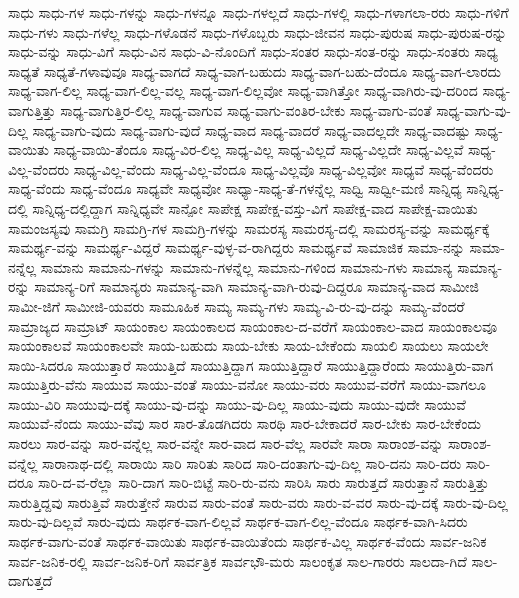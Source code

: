 {ಸಾಧು
ಸಾಧು-ಗಳ
ಸಾಧು-ಗಳನ್ನು
ಸಾಧು-ಗಳನ್ನೂ
ಸಾಧು-ಗಳಲ್ಲದೆ
ಸಾಧು-ಗಳಲ್ಲಿ
ಸಾಧು-ಗಳಾಗಲಾ-ರರು
ಸಾಧು-ಗಳಿಗೆ
ಸಾಧು-ಗಳು
ಸಾಧು-ಗಳೆಲ್ಲ
ಸಾಧು-ಗಳೊಡನೆ
ಸಾಧು-ಗಳೊಬ್ಬರು
ಸಾಧು-ಜೀವನ
ಸಾಧು-ಪುರುಷ
ಸಾಧು-ಪುರುಷ-ರನ್ನು
ಸಾಧು-ವನ್ನು
ಸಾಧು-ವಿಗೆ
ಸಾಧು-ವಿನ
ಸಾಧು-ವಿ-ನೊಂದಿಗೆ
ಸಾಧು-ಸಂತರ
ಸಾಧು-ಸಂತ-ರನ್ನು
ಸಾಧು-ಸಂತರು
ಸಾಧ್ಯ
ಸಾಧ್ಯತೆ
ಸಾಧ್ಯತೆ-ಗಳಾವುವೂ
ಸಾಧ್ಯ-ವಾಗದೆ
ಸಾಧ್ಯ-ವಾಗ-ಬಹುದು
ಸಾಧ್ಯ-ವಾಗ-ಬಹು-ದೆಂದೂ
ಸಾಧ್ಯ-ವಾಗ-ಲಾರದು
ಸಾಧ್ಯ-ವಾಗ-ಲಿಲ್ಲ
ಸಾಧ್ಯ-ವಾಗ-ಲಿಲ್ಲ-ವಲ್ಲ
ಸಾಧ್ಯ-ವಾಗ-ಲಿಲ್ಲವೋ
ಸಾಧ್ಯ-ವಾಗಿತ್ತೋ
ಸಾಧ್ಯ-ವಾಗಿರು-ವು-ದರಿಂದ
ಸಾಧ್ಯ-ವಾಗುತ್ತಿತ್ತು
ಸಾಧ್ಯ-ವಾಗುತ್ತಿರ-ಲಿಲ್ಲ
ಸಾಧ್ಯ-ವಾಗುವ
ಸಾಧ್ಯ-ವಾಗು-ವಂತಿರ-ಬೇಕು
ಸಾಧ್ಯ-ವಾಗು-ವಂತೆ
ಸಾಧ್ಯ-ವಾಗು-ವು-ದಿಲ್ಲ
ಸಾಧ್ಯ-ವಾಗು-ವುದು
ಸಾಧ್ಯ-ವಾಗು-ವುದೆ
ಸಾಧ್ಯ-ವಾದ
ಸಾಧ್ಯ-ವಾದರೆ
ಸಾಧ್ಯ-ವಾದಲ್ಲದೇ
ಸಾಧ್ಯ-ವಾದಷ್ಟು
ಸಾಧ್ಯ-ವಾಯಿತು
ಸಾಧ್ಯ-ವಾಯಿ-ತೆಂದೂ
ಸಾಧ್ಯ-ವಿರ-ಲಿಲ್ಲ
ಸಾಧ್ಯ-ವಿಲ್ಲ
ಸಾಧ್ಯ-ವಿಲ್ಲದೆ
ಸಾಧ್ಯ-ವಿಲ್ಲದೇ
ಸಾಧ್ಯ-ವಿಲ್ಲವೆ
ಸಾಧ್ಯ-ವಿಲ್ಲ-ವೆಂದರು
ಸಾಧ್ಯ-ವಿಲ್ಲ-ವೆಂದು
ಸಾಧ್ಯ-ವಿಲ್ಲ-ವೆಂದೂ
ಸಾಧ್ಯ-ವಿಲ್ಲವೊ
ಸಾಧ್ಯ-ವಿಲ್ಲವೋ
ಸಾಧ್ಯವೆ
ಸಾಧ್ಯ-ವೆಂದರು
ಸಾಧ್ಯ-ವೆಂದು
ಸಾಧ್ಯ-ವೆಂದೂ
ಸಾಧ್ಯವೇ
ಸಾಧ್ಯವೋ
ಸಾಧ್ಯಾ-ಸಾಧ್ಯ-ತೆ-ಗಳನ್ನೆಲ್ಲ
ಸಾಧ್ವಿ
ಸಾಧ್ವೀ-ಮಣಿ
ಸಾನ್ನಿಧ್ಯ
ಸಾನ್ನಿಧ್ಯ-ದಲ್ಲಿ
ಸಾನ್ನಿಧ್ಯ-ದಲ್ಲಿದ್ದಾಗ
ಸಾನ್ನಿಧ್ಯವೇ
ಸಾನ್ಪೋ
ಸಾಪೇಕ್ಷ
ಸಾಪೇಕ್ಷ-ವಸ್ತು-ವಿಗೆ
ಸಾಪೇಕ್ಷ-ವಾದ
ಸಾಪೇಕ್ಷ-ವಾಯಿತು
ಸಾಮಂಜಸ್ಯವು
ಸಾಮಗ್ರಿ
ಸಾಮಗ್ರಿ-ಗಳ
ಸಾಮಗ್ರಿ-ಗಳನ್ನು
ಸಾಮರಸ್ಯ
ಸಾಮರಸ್ಯ-ದಲ್ಲಿ
ಸಾಮರಸ್ಯ-ವನ್ನು
ಸಾಮರ್ಥ್ಯಕ್ಕೆ
ಸಾಮರ್ಥ್ಯ-ವನ್ನು
ಸಾಮರ್ಥ್ಯ-ವಿದ್ದರೆ
ಸಾಮರ್ಥ್ಯ-ವುಳ್ಳ-ವ-ರಾಗಿದ್ದರು
ಸಾಮರ್ಥ್ಯವೆ
ಸಾಮಾಜಿಕ
ಸಾಮಾ-ನನ್ನು
ಸಾಮಾ-ನನ್ನೆಲ್ಲ
ಸಾಮಾನು
ಸಾಮಾನು-ಗಳನ್ನು
ಸಾಮಾನು-ಗಳನ್ನೆಲ್ಲ
ಸಾಮಾನು-ಗಳಿಂದ
ಸಾಮಾನು-ಗಳು
ಸಾಮಾನ್ಯ
ಸಾಮಾನ್ಯ-ರನ್ನು
ಸಾಮಾನ್ಯ-ರಿಗೆ
ಸಾಮಾನ್ಯರು
ಸಾಮಾನ್ಯ-ವಾಗಿ
ಸಾಮಾನ್ಯ-ವಾಗಿ-ರುವು-ದಿದ್ದರೂ
ಸಾಮಾನ್ಯ-ವಾದ
ಸಾಮೀಜಿ
ಸಾಮೀ-ಜಿಗೆ
ಸಾಮೀಜಿ-ಯವರು
ಸಾಮೂಹಿಕ
ಸಾಮ್ಯ
ಸಾಮ್ಯ-ಗಳು
ಸಾಮ್ಯ-ವಿ-ರು-ವು-ದನ್ನು
ಸಾಮ್ಯ-ವೆಂದರೆ
ಸಾಮ್ರಾಜ್ಯದ
ಸಾಮ್ರಾಟ್
ಸಾಯಂಕಾಲ
ಸಾಯಂಕಾಲದ
ಸಾಯಂಕಾಲ-ದ-ವರೆಗೆ
ಸಾಯಂಕಾಲ-ವಾದ
ಸಾಯಂಕಾಲವೂ
ಸಾಯಂಕಾಲವೆ
ಸಾಯಂಕಾಲವೇ
ಸಾಯ-ಬಹುದು
ಸಾಯ-ಬೇಕು
ಸಾಯ-ಬೇಕೆಂದು
ಸಾಯಲಿ
ಸಾಯಲು
ಸಾಯಲೇ
ಸಾಯಿ-ಸಿದರೂ
ಸಾಯುತ್ತಾರೆ
ಸಾಯುತ್ತಿದೆ
ಸಾಯುತ್ತಿದ್ದಾಗ
ಸಾಯುತ್ತಿದ್ದಾರೆ
ಸಾಯುತ್ತಿದ್ದಾರೆಂದು
ಸಾಯುತ್ತಿರು-ವಾಗ
ಸಾಯುತ್ತಿರು-ವೆನು
ಸಾಯುವ
ಸಾಯು-ವಂತೆ
ಸಾಯು-ವನೋ
ಸಾಯು-ವರು
ಸಾಯುವ-ವರೆಗೆ
ಸಾಯು-ವಾಗಲೂ
ಸಾಯು-ವಿರಿ
ಸಾಯುವು-ದಕ್ಕೆ
ಸಾಯು-ವು-ದನ್ನು
ಸಾಯು-ವು-ದಿಲ್ಲ
ಸಾಯು-ವುದು
ಸಾಯು-ವುದೇ
ಸಾಯುವೆ
ಸಾಯುವೆ-ನೆಂದು
ಸಾಯು-ವೆವು
ಸಾರ
ಸಾರ-ತೊಡಗಿದರು
ಸಾರಥಿ
ಸಾರ-ಬೇಕಾದರೆ
ಸಾರ-ಬೇಕು
ಸಾರ-ಬೇಕೆಂದು
ಸಾರಲು
ಸಾರ-ವನ್ನು
ಸಾರ-ವನ್ನೆಲ್ಲ
ಸಾರ-ವನ್ನೇ
ಸಾರ-ವಾದ
ಸಾರ-ವೆಲ್ಲ
ಸಾರವೇ
ಸಾರಾ
ಸಾರಾಂಶ-ವನ್ನು
ಸಾರಾಂಶ-ವನ್ನೆಲ್ಲ
ಸಾರಾನಾಥ-ದಲ್ಲಿ
ಸಾರಾಯಿ
ಸಾರಿ
ಸಾರಿತು
ಸಾರಿದ
ಸಾರಿ-ದಂತಾಗು-ವು-ದಿಲ್ಲ
ಸಾರಿ-ದನು
ಸಾರಿ-ದರು
ಸಾರಿ-ದರೂ
ಸಾರಿ-ದ-ವ-ರೆಲ್ಲಾ
ಸಾರಿ-ದಾಗ
ಸಾರಿ-ಬಿಟ್ಟೆ
ಸಾರಿ-ರು-ವನು
ಸಾರಿಸಿ
ಸಾರು
ಸಾರುತ್ತದೆ
ಸಾರುತ್ತಾನೆ
ಸಾರುತ್ತಿತ್ತು
ಸಾರುತ್ತಿದ್ದವು
ಸಾರುತ್ತಿವೆ
ಸಾರುತ್ತೇನೆ
ಸಾರುವ
ಸಾರು-ವಂತೆ
ಸಾರು-ವರು
ಸಾರು-ವ-ವರ
ಸಾರು-ವು-ದಕ್ಕೆ
ಸಾರು-ವು-ದಿಲ್ಲ
ಸಾರು-ವು-ದಿಲ್ಲವೆ
ಸಾರು-ವುದು
ಸಾರ್ಥಕ-ವಾಗ-ಲಿಲ್ಲವೆ
ಸಾರ್ಥಕ-ವಾಗ-ಲಿಲ್ಲ-ವೆಂದೂ
ಸಾರ್ಥಕ-ವಾಗಿ-ಸಿದರು
ಸಾರ್ಥಕ-ವಾಗು-ವಂತೆ
ಸಾರ್ಥಕ-ವಾಯಿತು
ಸಾರ್ಥಕ-ವಾಯಿತೆಂದು
ಸಾರ್ಥಕ-ವಿಲ್ಲ
ಸಾರ್ಥಕ-ವೆಂದು
ಸಾರ್ವ-ಜನಿಕ
ಸಾರ್ವ-ಜನಿಕ-ರಲ್ಲಿ
ಸಾರ್ವ-ಜನಿಕ-ರಿಗೆ
ಸಾರ್ವತ್ರಿಕ
ಸಾರ್ವಭೌ-ಮರು
ಸಾಲಂಕೃತ
ಸಾಲ-ಗಾರರು
ಸಾಲದಾ-ಗಿದೆ
ಸಾಲ-ದಾಗುತ್ತದೆ
}
